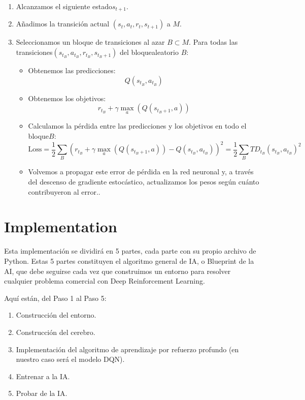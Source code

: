 \documentclass[
]{book}
\providecommand{\tightlist}{%
  \setlength{\itemsep}{0pt}\setlength{\parskip}{0pt}}
\begin{document}
\begin{enumerate}
\def\labelenumi{\arabic{enumi}.}
\setcounter{enumi}{3}
\item
  Alcanzamos el siguiente estado\(s_{t+1}\).
\item
  Añadimos la transición actual \((s_t, a_t, r_t, s_{t+1})\) a \(M\).
\item
  Seleccionamos un bloque de transiciones al azar \(B \subset M\). Para todas las transiciones\((s_{t_B}, a_{t_B}, r_{t_B}, s_{t_B+1})\) del bloquealeatorio \(B\):

  \begin{itemize}
  \tightlist
  \item
    Obtenemos las predicciones: \[Q(s_{t_B}, a_{t_B})\]
  \item
    Obtenemos los objetivos: \[r_{t_B} + \gamma \underset{a}{\max}(Q(s_{t_B+1}, a))\]
  \item
    Calculamos la pérdida entre las predicciones y los objetivos en todo el bloque\(B\): \[\textrm{Loss} = \frac{1}{2} \sum_B \left( r_{t_B} + \gamma \underset{a}{\max}(Q(s_{t_B+1}, a)) - Q(s_{t_B}, a_{t_B}) \right)^2 = \frac{1}{2} \sum_B TD_{t_B}(s_{t_B}, a_{t_B})^2\]
  \item
    Volvemos a propagar este error de pérdida en la red neuronal y, a través del descenso de gradiente estocástico, actualizamos los pesos según cuánto contribuyeron al error..
  \end{itemize}
\end{enumerate}

\hypertarget{implementation}{%
\section{Implementation}\label{implementation}}

Esta implementación se dividirá en 5 partes, cada parte con su propio archivo de Python. Estas 5 partes constituyen el algoritmo general de IA, o Blueprint de la AI, que debe seguirse cada vez que construimos un entorno para resolver cualquier problema comercial con Deep Reinforcement Learning.

Aquí están, del Paso 1 al Paso 5:

\begin{enumerate}
\def\labelenumi{\arabic{enumi}.}
\tightlist
\item
  Construcción del entorno.
\item
  Construcción del cerebro.
\item
  Implementación del algoritmo de aprendizaje por refuerzo profundo (en nuestro caso será el modelo DQN).
\item
  Entrenar a la IA.
\item
  Probar de la IA.
\end{enumerate}
\end{document}
